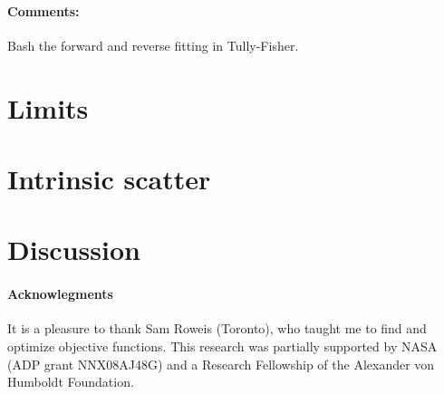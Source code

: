 \documentclass[12pt]{article}
\newcommand{\commentsname}{Comments}
\newenvironment{comments}{\paragraph{\commentsname:}}{}
\begin{document}
\begin{comments}
Bash the forward and reverse fitting in Tully-Fisher.
\end{comments}

\section{Limits}

\section{Intrinsic scatter}

\section{Discussion}

\paragraph{Acknowlegments}
It is a pleasure to thank Sam Roweis (Toronto), who taught me to find
and optimize objective functions.  This research was partially
supported by NASA (ADP grant NNX08AJ48G) and a Research Fellowship of
the Alexander von Humboldt Foundation.
\end{document}
